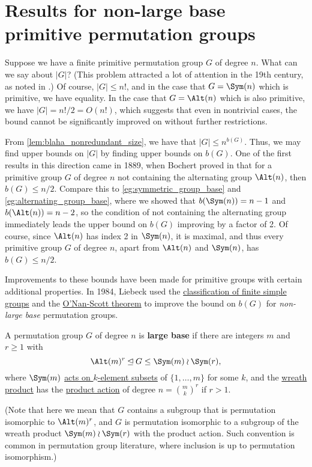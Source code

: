 \section{Results for non-large base primitive permutation groups}

Suppose we have a finite primitive permutation group $G$ of degree $n$. What can we say about $|G|$? (This problem attracted a lot of attention in the 19th century, as noted in \cite{moscatiello_roney-dougal2021}.) Of course, $|G| \leq n!$, and in the case that $G = \Sym(n)$ which is primitive, we have equality. In the case that $G = \Alt(n)$ which is also primitive, we have $|G| = n!/2 = O(n!)$, which suggests that even in nontrivial cases, the bound cannot be significantly improved on without further restrictions.

From \autoref{lem:blaha_nonredundant_size}, we have that $|G| \leq n^{b(G)}$. Thus, we may find upper bounds on $|G|$ by finding upper bounds on $b(G)$. One of the first results in this direction came in 1889, when Bochert proved in \cite{bochert1889} that for a primitive group $G$ of degree $n$ not containing the alternating group $\Alt(n)$, then $b(G) \leq n/2$. Compare this to \autoref{eg:symmetric_group_base} and \autoref{eg:alternating_group_base}, where we showed that $b(\Sym(n)) = n-1$ and $b(\Alt(n)) = n-2$, so the condition of not containing the alternating group immediately leads the upper bound on $b(G)$ improving by a factor of 2. Of course, since $\Alt(n)$ has index 2 in $\Sym(n)$, it is maximal, and thus every primitive group $G$ of degree $n$, apart from $\Alt(n)$ and $\Sym(n)$, has $b(G) \leq n/2$.

Improvements to these bounds have been made for primitive groups with certain additional properties. In 1984, Liebeck used the \hyperref[thm:cfsg]{classification of finite simple groups} and the \hyperref[thm:onan-scott]{O'Nan-Scott theorem} to improve the bound on $b(G)$ for \textit{non-large base} permutation groups.

\begin{definition}\label{def:large_base}
    A permutation group $G$ of degree $n$ is \textbf{large base} if there are integers $m$ and $r \geq 1$ with
    $$\Alt(m)^r \unlhd G \leq \Sym(m) \wr \Sym(r),$$
    where $\Sym(m)$ \hyperref[eg:product_action_Sm_subsets]{acts on $k$-element subsets} of $\{1,\dotsc,m\}$ for some $k$, and the \hyperref[def:wreath_product]{wreath product} has the \hyperref[def:product_action]{product action} of degree $n = \binom{m}{k}^r$ if $r > 1$.

    (Note that here we mean that $G$ contains a subgroup that is permutation isomorphic to $\Alt(m)^r$, and $G$ is permutation isomorphic to a subgroup of the wreath product $\Sym(m) \wr \Sym(r)$ with the product action. Such convention is common in permutation group literature, where inclusion is up to permutation isomorphism.)
\end{definition}

